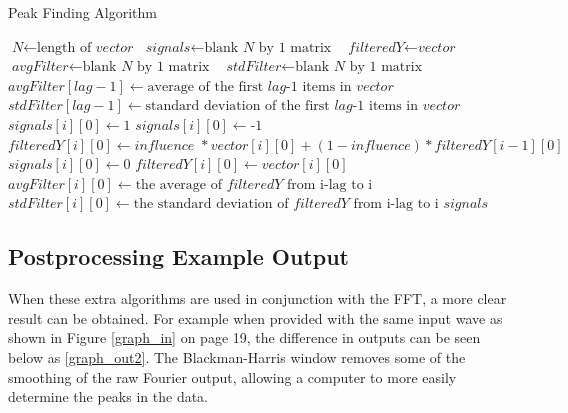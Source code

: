 \documentclass[12pt]{report}
\begin{document}
\begin{algorithm}
\caption{Peak Finding Algorithm}\label{peak_algo}
\begin{algorithmic}[4]

\State $\textit{N} \gets \text{length of }\textit{vector}$
\State $\textit{signals} \gets \text{blank }\textit{N} \text{ by 1 matrix }$
\State $\textit{filteredY} \gets \textit{vector}$
\State $\textit{avgFilter} \gets \text{blank }\textit{N} \text{ by 1 matrix }$
\State $\textit{stdFilter} \gets \text{blank }\textit{N} \text{ by 1 matrix }$
\State $\textit{avgFilter}[lag-1] \gets \text{average of the first }\textit{lag-1} \text{ items in } \textit{vector}$
\State $\textit{stdFilter}[lag-1] \gets \text{standard deviation of the first }\textit{lag-1} \text{ items in } \textit{vector}$
            \State $\textit{signals}[i][0] \gets \text{1}$
        \Else
            \State $\textit{signals}[i][0] \gets \text{-1}$
        \EndIf
        \State $\textit{filteredY}[i][0] \gets \textit{influence } * \textit{vector} [i][0] + (1-\textit{influence})*\textit{filteredY}[i-1][0]$
    \Else
        \State $\textit{signals}[i][0] \gets \text{0}$
        \State $\textit{filteredY}[i][0] \gets \textit{vector}[i][0]$
    \EndIf
        \State $\textit{avgFilter}[i][0] \gets \text{the average of } \textit{filteredY} \text{ from i-lag to i}$
        \State $\textit{stdFilter}[i][0] \gets \text{the standard deviation of } \textit{filteredY} \text{ from i-lag to i}$
\EndFor
\Return $\textit{signals}$
\EndProcedure
\end{algorithmic}
\end{algorithm}

\subsection*{Postprocessing Example Output}
When these extra algorithms are used in conjunction with the FFT, a more clear result can be obtained. For example when provided with the same input wave as shown in Figure \ref{graph_in} on page 19, the difference in outputs can be seen below as \ref{graph_out2}. The Blackman-Harris window removes some of the smoothing of the raw Fourier output, allowing a computer to more easily determine the peaks in the data.
\end{document}
